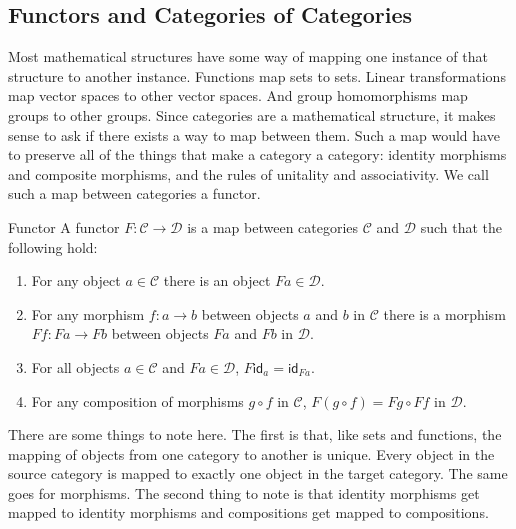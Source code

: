 \documentclass[12pt]{article}
\begin{document}
\subsection*{Functors and Categories of Categories}
Most mathematical structures have some way of mapping one instance of that structure to another instance.
Functions map sets to sets.
Linear transformations map vector spaces to other vector spaces.
And group homomorphisms map groups to other groups.
Since categories are a mathematical structure, it makes sense to ask if there exists a way to map between them.
Such a map would have to preserve all of the things that make a category a category: identity morphisms and composite morphisms, and the rules of unitality and associativity.
We call such a map between categories a functor.
\begin{definition}{Functor}{}
    A functor $F:\mathcal{C}\rightarrow\mathcal{D}$ is a map between categories $\mathcal{C}$ and $\mathcal{D}$ such that the following hold:
    \begin{enumerate}
        \item For any object $a\in\mathcal{C}$ there is an object $Fa\in\mathcal{D}$.
        \item For any morphism $f:a\rightarrow b$ between objects $a$ and $b$ in $\mathcal{C}$ there is a morphism $Ff:Fa\rightarrow Fb$ between objects $Fa$ and  $Fb$ in $\mathcal{D}$.
        \item For all objects $a\in\mathcal{C}$ and $Fa\in\mathcal{D}$, $F\mathsf{id}_a=\mathsf{id}_{Fa}$.
        \item For any composition of morphisms $g\circ f$ in $\mathcal{C}$, $F(g\circ f)=Fg\circ Ff$ in $\mathcal{D}$.
    \end{enumerate}
\end{definition}

There are some things to note here.
The first is that, like sets and functions, the mapping of objects from one category to another is unique.
Every object in the source category is mapped to exactly one object in the target category.
The same goes for morphisms.
The second thing to note is that identity morphisms get mapped to identity morphisms and compositions get mapped to compositions.
\end{document}
